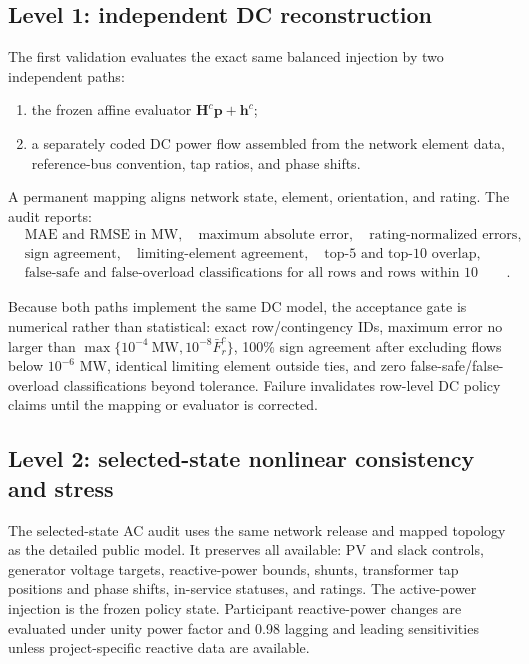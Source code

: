 \documentclass[10pt,journal,onecolumn]{IEEEtran}
\begin{document}
\subsection{Level 1: independent DC reconstruction}

The first validation evaluates the exact same balanced injection by two
independent paths:
\begin{enumerate}[leftmargin=*,itemsep=2pt]
\item the frozen affine evaluator $\bm H^c\bm p+\bm h^c$;
\item a separately coded DC power flow assembled from the network element data,
reference-bus convention, tap ratios, and phase shifts.
\end{enumerate}
A permanent mapping aligns network state, element, orientation, and rating.
The audit reports:
\begin{align*}
&\text{MAE and RMSE in MW},\quad
\text{maximum absolute error},\quad
\text{rating-normalized errors},\\
&\text{sign agreement},\quad
\text{limiting-element agreement},\quad
\text{top-5 and top-10 overlap},\\
&\text{false-safe and false-overload classifications for all rows and rows
within 10 percentage points of rating}.
\end{align*}

Because both paths implement the same DC model, the acceptance gate is
numerical rather than statistical: exact row/contingency IDs, maximum error no
larger than
$\max\{10^{-4}\ \mathrm{MW},10^{-8}\bar F_r^c\}$, 100\% sign agreement after
excluding flows below $10^{-6}$ MW, identical limiting element outside ties,
and zero false-safe/false-overload classifications beyond tolerance. Failure
invalidates row-level DC policy claims until the mapping or evaluator is
corrected.

\subsection{Level 2: selected-state nonlinear consistency and stress}

The selected-state AC audit uses the same network release and mapped topology
as the detailed public model. It preserves all available:
PV and slack controls, generator voltage targets, reactive-power bounds,
shunts, transformer tap positions and phase shifts, in-service statuses, and
ratings. The active-power injection is the frozen policy state. Participant
reactive-power changes are evaluated under unity power factor and 0.98 lagging
and leading sensitivities unless project-specific reactive data are available.
\end{document}
